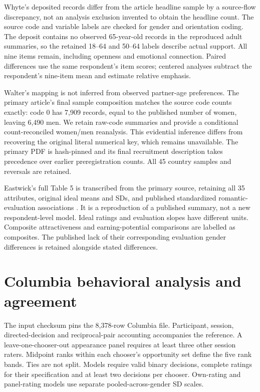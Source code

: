Whyte's deposited records differ from the article headline sample by a source-flow discrepancy, not an analysis exclusion invented to obtain the headline count. The source code and variable labels are checked for gender and orientation coding. The deposit contains no observed 65-year-old records in the reproduced adult summaries, so the retained 18--64 and 50--64 labels describe actual support. All nine items remain, including openness and emotional connection. Paired differences use the same respondent's item scores; centered analyses subtract the respondent's nine-item mean and estimate relative emphasis.




Walter's mapping is not inferred from observed partner-age preferences. The primary article's final sample composition matches the source code counts exactly: code 0 has 7,909 records, equal to the published number of women, leaving 6,490 men. We retain raw-code summaries and provide a conditional count-reconciled women/men reanalysis. This evidential inference differs from recovering the original literal numerical key, which remains unavailable. The primary PDF is hash-pinned and its final recruitment description takes precedence over earlier preregistration counts. All 45 country samples and reversals are retained.



Eastwick's full Table 5 is transcribed from the primary source, retaining all 35 attributes, original ideal means and SDs, and published standardized romantic-evaluation associations \citep{matching2025}. It is a reproduction of a published summary, not a new respondent-level model. Ideal ratings and evaluation slopes have different units. Composite attractiveness and earning-potential comparisons are labelled as composites. The published lack of their corresponding evaluation gender differences is retained alongside stated differences.




\section{Columbia behavioral analysis and agreement}

The input checksum pins the 8,378-row Columbia file. Participant, session, directed-decision and reciprocal-pair accounting accompanies the reference. A leave-one-chooser-out appearance panel requires at least three other session raters. Midpoint ranks within each chooser's opportunity set define the five rank bands. Ties are not split. Models require valid binary decisions, complete ratings for their specification and at least two decisions per chooser. Own-rating and panel-rating models use separate pooled-across-gender SD scales.

